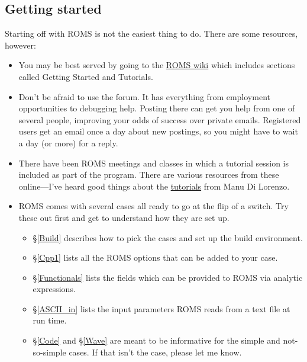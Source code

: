 \subsection{Getting started}
Starting off with ROMS is not the easiest thing to do. There are
some resources, however:
\begin{itemize}
   \item You may be best served by going to the 
\href{https://www.myroms.org/wiki/}{ROMS wiki} which includes
sections called Getting Started and Tutorials.
   \item Don't be afraid to use the forum. It has everything from
employment opportunities to debugging help. Posting there can get
you help from one of several people, improving your odds of success
over private emails. Registered users get an email once a day about
new postings, so you might have to wait a day (or more) for a reply.
   \item There have been ROMS meetings and classes in which a tutorial
session is included as part of the program. There are various resources
from these online---I've heard good things about the
\href{http://eros.eas.gatech.edu/ROMS-Tutorial/tutorials.html}{tutorials}
from Manu Di Lorenzo.
   \item ROMS comes with several cases all ready to go at the flip
of a switch. Try these out first and get to understand how they
are set up.
    \begin{itemize}
      \item \S\ref{Build} describes how to pick the cases and set up
      the build environment.
      \item \S\ref{Cpp1} lists all the ROMS options that can be
      added to your case.
      \item \S\ref{Functionals} lists the fields which can be
      provided to ROMS via analytic expressions.
      \item \S\ref{ASCII_in} lists the input parameters ROMS reads
      from a text file at run time.
      \item \S\ref{Code} and \S\ref{Wave} are meant to be
      informative for the simple and not-so-simple cases. If that
      isn't the case, please let me know.
    \end{itemize}
\end{itemize}

